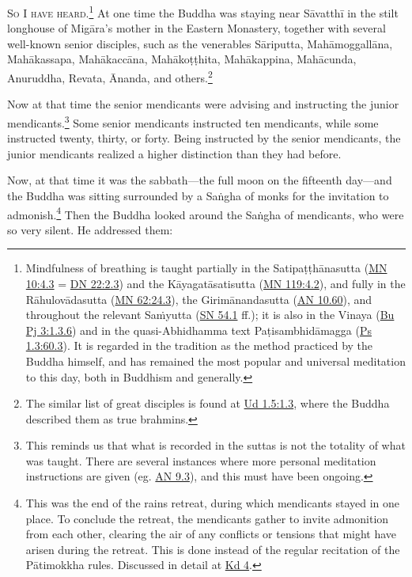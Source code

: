 \documentclass[12pt,openany]{book}%
\newcommand*{\scevam}[1]{\textsc{#1}}
\begin{document}
\scevam{So I have heard.\footnote{Mindfulness of breathing is taught partially in the \textsanskrit{Satipaṭṭhānasutta} (\href{https://suttacentral.net/mn10/en/sujato\#4.3}{MN 10:4.3} = \href{https://suttacentral.net/dn22/en/sujato\#2.3}{DN 22:2.3}) and the \textsanskrit{Kāyagatāsatisutta} (\href{https://suttacentral.net/mn119/en/sujato\#4.2}{MN 119:4.2}), and fully in the \textsanskrit{Rāhulovādasutta} (\href{https://suttacentral.net/mn62/en/sujato\#24.3}{MN 62:24.3}), the \textsanskrit{Girimānandasutta} (\href{https://suttacentral.net/an10.60/en/sujato}{AN 10.60}), and throughout the relevant \textsanskrit{Saṁyutta} (\href{https://suttacentral.net/sn54.1/en/sujato}{SN 54.1} ff.); it is also in the Vinaya (\href{https://suttacentral.net/pli-tv-bu-vb-pj3/en/sujato\#1.3.6}{Bu Pj 3:1.3.6}) and in the quasi-Abhidhamma text \textsanskrit{Paṭisambhidāmagga} (\href{https://suttacentral.net/ps1.3/en/sujato\#60.3}{Ps 1.3:60.3}). It is regarded in the tradition as the method practiced by the Buddha himself, and has remained the most popular and universal meditation to this day, both in Buddhism and generally. } }At one time the Buddha was staying near \textsanskrit{Sāvatthī} in the stilt longhouse of \textsanskrit{Migāra}’s mother in the Eastern Monastery, together with several well-known senior disciples, such as the venerables \textsanskrit{Sāriputta}, \textsanskrit{Mahāmoggallāna}, \textsanskrit{Mahākassapa}, \textsanskrit{Mahākaccāna}, \textsanskrit{Mahākoṭṭhita}, \textsanskrit{Mahākappina}, \textsanskrit{Mahācunda}, Anuruddha, Revata, Ānanda, and others.\footnote{The similar list of great disciples is found at \href{https://suttacentral.net/ud1.5/en/sujato\#1.3}{Ud 1.5:1.3}, where the Buddha described them as true brahmins. } 

Now at that time the senior mendicants were advising and instructing the junior mendicants.\footnote{This reminds us that what is recorded in the suttas is not the totality of what was taught. There are several instances where more personal meditation instructions are given (eg. \href{https://suttacentral.net/an9.3/en/sujato}{AN 9.3}), and this must have been ongoing. } Some senior mendicants instructed ten mendicants, while some instructed twenty, thirty, or forty. Being instructed by the senior mendicants, the junior mendicants realized a higher distinction than they had before. 

Now, at that time it was the sabbath—the full moon on the fifteenth day—and the Buddha was sitting surrounded by a \textsanskrit{Saṅgha} of monks for the invitation to admonish.\footnote{This was the end of the rains retreat, during which mendicants stayed in one place. To conclude the retreat, the mendicants gather to invite admonition from each other, clearing the air of any conflicts or tensions that might have arisen during the retreat. This is done instead of the regular recitation of the \textsanskrit{Pātimokkha} rules. Discussed in detail at \href{https://suttacentral.net/pli-tv-kd4/en/sujato}{Kd 4}. } Then the Buddha looked around the \textsanskrit{Saṅgha} of mendicants, who were so very silent. He addressed them: 
\end{document}
